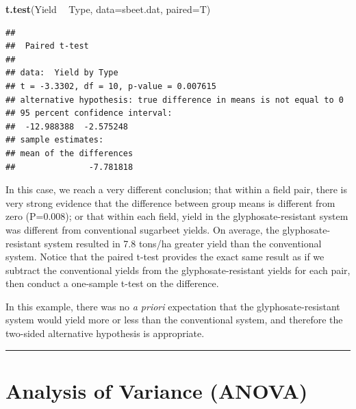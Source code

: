 \documentclass[letterpaper,]{book}
\newenvironment{Shaded}{\begin{snugshade}}{\end{snugshade}}
\newcommand{\DataTypeTok}[1]{\textcolor[rgb]{0.13,0.29,0.53}{#1}}
\newcommand{\KeywordTok}[1]{\textcolor[rgb]{0.13,0.29,0.53}{\textbf{#1}}}
\newcommand{\NormalTok}[1]{#1}
\newcommand{\OperatorTok}[1]{\textcolor[rgb]{0.81,0.36,0.00}{\textbf{#1}}}
\newcommand{\StringTok}[1]{\textcolor[rgb]{0.31,0.60,0.02}{#1}}
\begin{document}
\begin{Shaded}
\begin{Highlighting}[]
\KeywordTok{t.test}\NormalTok{(Yield }\OperatorTok{~}\StringTok{ }\NormalTok{Type, }\DataTypeTok{data=}\NormalTok{sbeet.dat, }\DataTypeTok{paired=}\NormalTok{T)}
\end{Highlighting}
\end{Shaded}

\begin{verbatim}
## 
##  Paired t-test
## 
## data:  Yield by Type
## t = -3.3302, df = 10, p-value = 0.007615
## alternative hypothesis: true difference in means is not equal to 0
## 95 percent confidence interval:
##  -12.988388  -2.575248
## sample estimates:
## mean of the differences 
##               -7.781818
\end{verbatim}

In this case, we reach a very different conclusion; that within a field pair, there is very strong evidence that the difference between group means is different from zero (P=0.008); or that within each field, yield in the glyphosate-resistant system was different from conventional sugarbeet yields. On average, the glyphosate-resistant system resulted in 7.8 tons/ha greater yield than the conventional system. Notice that the paired t-test provides the exact same result as if we subtract the conventional yields from the glyphosate-resistant yields for each pair, then conduct a one-sample t-test on the difference.

\begin{Shaded}
\end{Shaded}

In this example, there was no \emph{a priori} expectation that the glyphosate-resistant system would yield more or less than the conventional system, and therefore the two-sided alternative hypothesis is appropriate.

\begin{center}\rule{0.5\linewidth}{0.5pt}\end{center}

\hypertarget{anova}{%
\chapter{Analysis of Variance (ANOVA)}\label{anova}}
\end{document}
